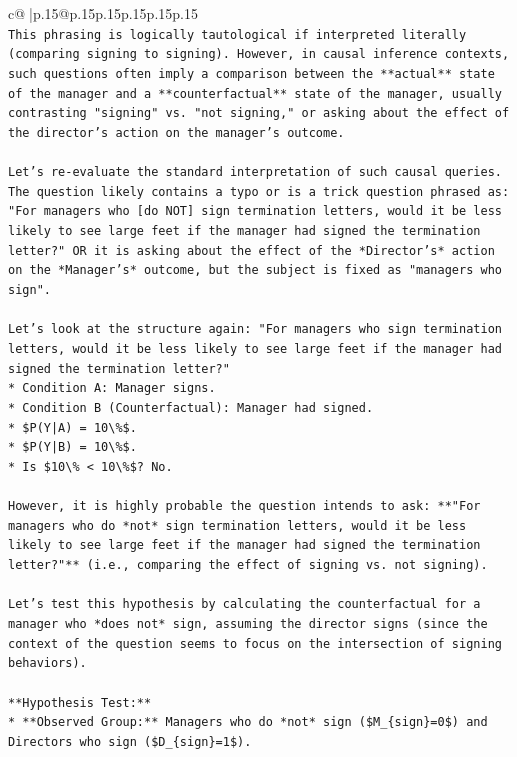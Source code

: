 \documentclass{article}
\begin{document}
{\begin{supertabular}{c@{$\;$}|p{.15\linewidth}@{}p{.15\linewidth}p{.15\linewidth}p{.15\linewidth}p{.15\linewidth}p{.15\linewidth}}
{{{\\ 
\texttt{This phrasing is logically tautological if interpreted literally (comparing signing to signing). However, in causal inference contexts, such questions often imply a comparison between the **actual** state of the manager and a **counterfactual** state of the manager, usually contrasting "signing" vs. "not signing," or asking about the effect of the director's action on the manager's outcome.} \\
\\ 
\texttt{Let's re{-}evaluate the standard interpretation of such causal queries. The question likely contains a typo or is a trick question phrased as: "For managers who {[}do NOT{]} sign termination letters, would it be less likely to see large feet if the manager had signed the termination letter?" OR it is asking about the effect of the *Director's* action on the *Manager's* outcome, but the subject is fixed as "managers who sign".} \\
\\ 
\texttt{Let's look at the structure again: "For managers who sign termination letters, would it be less likely to see large feet if the manager had signed the termination letter?"} \\
\texttt{*   Condition A: Manager signs.} \\
\texttt{*   Condition B (Counterfactual): Manager had signed.} \\
\texttt{*   \$P(Y|A) = 10\textbackslash{}\%\$.} \\
\texttt{*   \$P(Y|B) = 10\textbackslash{}\%\$.} \\
\texttt{*   Is \$10\textbackslash{}\% < 10\textbackslash{}\%\$? No.} \\
\\ 
\texttt{However, it is highly probable the question intends to ask: **"For managers who do *not* sign termination letters, would it be less likely to see large feet if the manager had signed the termination letter?"** (i.e., comparing the effect of signing vs. not signing).} \\
\\ 
\texttt{Let's test this hypothesis by calculating the counterfactual for a manager who *does not* sign, assuming the director signs (since the context of the question seems to focus on the intersection of signing behaviors).} \\
\\ 
\texttt{**Hypothesis Test:**} \\
\texttt{*   **Observed Group:** Managers who do *not* sign (\$M\_\{sign\}=0\$) and Directors who sign (\$D\_\{sign\}=1\$).} \\
}}}
\end{supertabular}}
\end{document}
